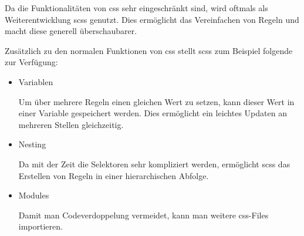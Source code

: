 Da die Funktionalitäten von \gls{css} sehr eingeschränkt sind, wird oftmals als Weiterentwicklung \gls{scss} genutzt. Dies ermöglicht das Vereinfachen von Regeln und macht diese generell überschaubarer.

Zusätzlich zu den normalen Funktionen von \gls{css} stellt \gls{scss} zum Beispiel folgende zur Verfügung: \cite{SCSS}

\begin{itemize}
    \item Variablen

          Um über mehrere Regeln einen gleichen Wert zu setzen, kann dieser Wert in einer Variable gespeichert werden. Dies ermöglicht ein leichtes Updaten an mehreren Stellen gleichzeitig.

    \item Nesting

          Da mit der Zeit die Selektoren sehr kompliziert werden, ermöglicht \gls{scss} das Erstellen von Regeln in einer hierarchischen Abfolge.

    \item Modules

          Damit man Codeverdoppelung vermeidet, kann man weitere \gls{css}-Files importieren.
\end{itemize}